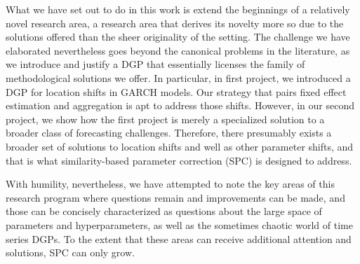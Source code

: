 \documentclass{uiucthesis2021}
\theoremstyle{definition}
\newcounter{counterforappendices}
\begin{document}
What we have set out to do in this work is extend the beginnings of a relatively novel research area, a research area that derives its novelty more so due to the solutions offered than the sheer originality of the setting.  The challenge we have elaborated nevertheless goes beyond the canonical problems in the literature, as we introduce and justify a DGP that essentially licenses the family of methodological solutions we offer. In particular, in first project, we introduced a DGP for location shifts in GARCH models.  Our strategy that pairs fixed effect estimation and aggregation is apt to address those shifts.  However, in our second project, we show how the first project is merely a specialized solution to a broader class of forecasting challenges.  Therefore, there presumably exists a broader set of solutions to location shifts and well as other parameter shifts, and that is what similarity-based parameter correction (SPC) is designed to address.

With humility, nevertheless, we have attempted to note the key areas of this research program where questions remain and improvements can be made, and those can be concisely characterized as questions about the large space of parameters and hyperparameters, as well as the sometimes chaotic world of time series DGPs.  To the extent that these areas can receive additional attention and solutions, SPC can only grow. 


\backmatter

\printbibliography[heading=bibintoc,title={References}]

\clearpage
\setcounter{counterforappendices}{\value{page}}
\mainmatter
\setcounter{page}{\value{counterforappendices}}




% 
\end{document}
